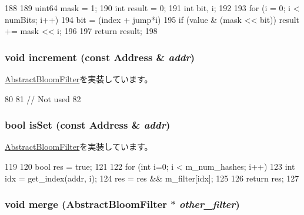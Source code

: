 \begin{DoxyCode}
188 {
189     uint64 mask = 1;
190     int result = 0;
191     int bit, i;
192 
193     for (i = 0; i < numBits; i++) {
194         bit = (index + jump*i) %
195         if (value & (mask << bit)) result += mask << i;
196     }
197     return result;
198 }
\end{DoxyCode}
\hypertarget{classMultiBitSelBloomFilter_a3e860ad851b771ac3b6eeb1716eb56bc}{
\subsubsection[{increment}]{\setlength{\rightskip}{0pt plus 5cm}void increment (const {\bf Address} \& {\em addr})}}
\label{classMultiBitSelBloomFilter_a3e860ad851b771ac3b6eeb1716eb56bc}


\hyperlink{classAbstractBloomFilter_af795f7fdeff0174e914ed1d792ffe4ff}{AbstractBloomFilter}を実装しています。


\begin{DoxyCode}
80 {
81     // Not used
82 }
\end{DoxyCode}
\hypertarget{classMultiBitSelBloomFilter_a4200ee289c3d941a4b209c4788f8087c}{
\subsubsection[{isSet}]{\setlength{\rightskip}{0pt plus 5cm}bool isSet (const {\bf Address} \& {\em addr})}}
\label{classMultiBitSelBloomFilter_a4200ee289c3d941a4b209c4788f8087c}


\hyperlink{classAbstractBloomFilter_aa1b69d102655f8c5879b3df95eb205dc}{AbstractBloomFilter}を実装しています。


\begin{DoxyCode}
119 {
120     bool res = true;
121 
122     for (int i=0; i < m_num_hashes; i++) {
123         int idx = get_index(addr, i);
124         res = res && m_filter[idx];
125     }
126     return res;
127 }
\end{DoxyCode}
\hypertarget{classMultiBitSelBloomFilter_a4091f5f95de040d4e0ae5bd86817b13c}{
\subsubsection[{merge}]{\setlength{\rightskip}{0pt plus 5cm}void merge ({\bf AbstractBloomFilter} $\ast$ {\em other\_\-filter})}}
\label{classMultiBitSelBloomFilter_a4091f5f95de040d4e0ae5bd86817b13c}



